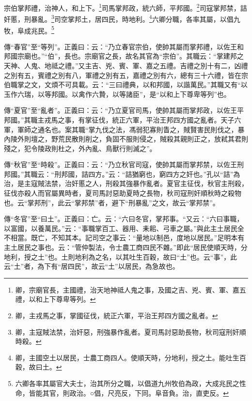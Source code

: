 宗伯掌邦禮，治神人，和上下。\footnote{卿，宗廟官長，主國禮，治天地神祗人鬼之事，及國之吉、兇、賓、軍、嘉五禮，以和上下尊卑等列。}司馬掌邦政，統六師，平邦國。\footnote{卿，主戎馬之事，掌國征伐，統正六軍，平治王邦四方國之亂者。}司寇掌邦禁，詰奸慝，刑暴亂。\footnote{卿，主寇賊法禁，治奸惡，刑強暴作亂者。夏司馬討惡助長物，秋司寇刑奸順時殺。}司空掌邦土，居四民，時地利。\footnote{卿，主國空土以居民，士農工商四人。使順天時，分地利，授之土。能吐生百穀，故曰土。}六卿分職，各率其屬，以倡九牧，阜成兆民。\footnote{六卿各率其屬官大夫士，治其所分之職，以倡道九州牧伯為政，大成兆民之性命，皆能其官，則政治。○倡，尺亮反，下同。阜音負。治，直吏反。}

{\noindent\zhuan{}\fzbyks 傳“春官”至“等列”。正義曰：云：“乃立春官宗伯，使帥其屬而掌邦禮，以佐王和邦國宗廟也。”“伯”，長也。宗廟官之長，故名其官為“宗伯”。其職云：“掌建邦之天神、人鬼、地祗之禮。”又主吉、兇、賓、軍、嘉之五禮。吉禮之別十有二，凶禮之別有五，賓禮之別有八，軍禮之別有五，嘉禮之別有六，總有三十六禮，皆在宗伯職掌之文，文煩不可具載。云：“三曰禮典，以和邦國，以諧萬民。”其職又有“以玉作六瑞，以等邦國。以禽作六贄，以等諸臣”，是“以和上下尊卑等列”也。 \par}

{\noindent\zhuan{}\fzbyks 傳“夏官”至“亂者”。正義曰：云：“乃立夏官司馬，使帥其屬而掌邦政，以佐王平邦國。”其職主戎馬之事，有掌征伐，統正六軍，平治王邦四方國之亂者。天子六軍，軍師之通名也。案其職“掌九伐之法，馮弱犯寡則眚之，賊賢害民則伐之，暴內陵外則壇之，野荒民散則削之，負固不服則侵之，賊殺其親則正之，放弒其君則殘之，犯令陵政則杜之，外內亂、鳥獸行則滅之”。 \par}

{\noindent\zhuan{}\fzbyks 傳“秋官”至“時殺”。正義曰：云：“乃立秋官司寇，使帥其屬而掌邦禁，以佐王刑邦國。”其職云：“刑邦國，詰四方。”云：“詰猶窮也，窮四方之奸也。”孔以“詰”為治，是主寇賊法禁，治奸慝之人，刑殺其強暴作亂者。夏官主征伐，秋官主刑殺，征伐亦殺人而官屬異時者，夏司馬討惡助夏時之長物，秋司寇刑奸順秋時之殺物也。云“掌邦刑”，此云“掌邦禁”者，避下“刑暴亂”之文，故云“掌邦禁”。 \par}

{\noindent\zhuan{}\fzbyks 傳“冬官”至“曰土”。正義曰：亡。云：“六曰冬官，掌邦事。“又云：“六曰事職，以富國，以養萬民。”云：“事職掌百工、器用、耒耜、弓車之屬。”與此主土居民全不相當。既亡，不知其本。記司空之事云：“量地以制邑，度地以居民。”足明本有主土居民之事也。云：“管仲製法，令士農工商四民不雜。”即此“居民使順天時，分地利，授之土”也。土則地利為之名，以其吐生百穀，故曰“土”也。云“事”，此云“土”者，為下有“居四民”，故云“土”以居民，為急故也。 \par}


